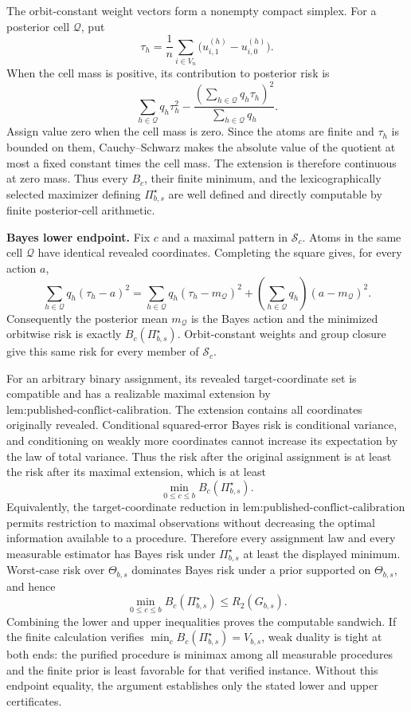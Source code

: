 The orbit-constant weight vectors form a nonempty compact simplex. For a posterior cell \(\mathcal Q\), put
\[
\tau_h=\frac1n\sum_{i\in V_n}\bigl(u^{(h)}_{i,1}-u^{(h)}_{i,0}\bigr).
\]
When the cell mass is positive, its contribution to posterior risk is
\[
\sum_{h\in\mathcal Q}q_h\tau_h^2
-\frac{\left(\sum_{h\in\mathcal Q}q_h\tau_h\right)^2}
{\sum_{h\in\mathcal Q}q_h}.
\]
Assign value zero when the cell mass is zero. Since the atoms are finite and \(\tau_h\) is bounded on them, Cauchy--Schwarz makes the absolute value of the quotient at most a fixed constant times the cell mass. The extension is therefore continuous at zero mass. Thus every \(B_c\), their finite minimum, and the lexicographically selected maximizer defining \(\Pi_{b,s}^{\star}\) are well defined and directly computable by finite posterior-cell arithmetic.

\textbf{Bayes lower endpoint.}
Fix \(c\) and a maximal pattern in \(\mathcal S_c\). Atoms in the same cell \(\mathcal Q\) have identical revealed coordinates. Completing the square gives, for every action \(a\),
\[
\sum_{h\in\mathcal Q}q_h(\tau_h-a)^2
=\sum_{h\in\mathcal Q}q_h(\tau_h-m_{\mathcal Q})^2
+\left(\sum_{h\in\mathcal Q}q_h\right)(a-m_{\mathcal Q})^2.
\]
Consequently the posterior mean \(m_{\mathcal Q}\) is the Bayes action and the minimized orbitwise risk is exactly \(B_c(\Pi_{b,s}^{\star})\). Orbit-constant weights and group closure give this same risk for every member of \(\mathcal S_c\).

For an arbitrary binary assignment, its revealed target-coordinate set is compatible and has a realizable maximal extension by \(\text{lem:published-conflict-calibration}\). The extension contains all coordinates originally revealed. Conditional squared-error Bayes risk is conditional variance, and conditioning on weakly more coordinates cannot increase its expectation by the law of total variance. Thus the risk after the original assignment is at least the risk after its maximal extension, which is at least
\[
\min_{0\leq c\leq b}B_c(\Pi_{b,s}^{\star}).
\]
Equivalently, the target-coordinate reduction in \(\text{lem:published-conflict-calibration}\) permits restriction to maximal observations without decreasing the optimal information available to a procedure. Therefore every assignment law and every measurable estimator has Bayes risk under \(\Pi_{b,s}^{\star}\) at least the displayed minimum. Worst-case risk over \(\Theta_{b,s}\) dominates Bayes risk under a prior supported on \(\Theta_{b,s}\), and hence
\[
\min_{0\leq c\leq b}B_c(\Pi_{b,s}^{\star})
\leq R_2(G_{b,s}).
\]
Combining the lower and upper inequalities proves the computable sandwich. If the finite calculation verifies \(\min_cB_c(\Pi_{b,s}^{\star})=V_{b,s}\), weak duality is tight at both ends: the purified procedure is minimax among all measurable procedures and the finite prior is least favorable for that verified instance. Without this endpoint equality, the argument establishes only the stated lower and upper certificates.